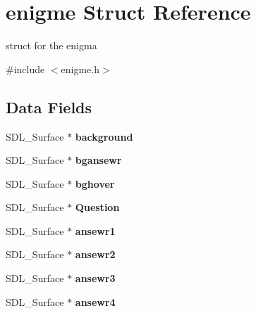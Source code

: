 \hypertarget{structenigme}{}\section{enigme Struct Reference}
\label{structenigme}


struct for the enigma  




{\ttfamily \#include $<$enigme.\+h$>$}

\subsection*{Data Fields}
\begin{DoxyCompactItemize}
\item 
\mbox{\label{structenigme_afef580eaca259227dac7bbae2d09f8f7}} 
S\+D\+L\+\_\+\+Surface $\ast$ {\bfseries background}
\item 
\mbox{\label{structenigme_a10ee397636fe45d16379476fb990c58a}} 
S\+D\+L\+\_\+\+Surface $\ast$ {\bfseries bgansewr}
\item 
\mbox{\label{structenigme_aebbf2d7046b5e0545f7b84fef6e98831}} 
S\+D\+L\+\_\+\+Surface $\ast$ {\bfseries bghover}
\item 
\mbox{\label{structenigme_a917462fa7abd51385bfb39274d24c11f}} 
S\+D\+L\+\_\+\+Surface $\ast$ {\bfseries Question}
\item 
\mbox{\label{structenigme_ab3a0b156348a72483447216e90c28af0}} 
S\+D\+L\+\_\+\+Surface $\ast$ {\bfseries ansewr1}
\item 
\mbox{\label{structenigme_a97c066a4114758708b5b4400f07de023}} 
S\+D\+L\+\_\+\+Surface $\ast$ {\bfseries ansewr2}
\item 
\mbox{\label{structenigme_a49754c0a7b2de36218e07574b0df6ea4}} 
S\+D\+L\+\_\+\+Surface $\ast$ {\bfseries ansewr3}
\item 
\mbox{\label{structenigme_a4eb7509adf07f09049e9a375d249bea6}} 
S\+D\+L\+\_\+\+Surface $\ast$ {\bfseries ansewr4}
\item 
\mbox{\label{structenigme_ad4909b90c50cc4caf5d702e18f83e335}} 

\end{DoxyCompactItemize}
